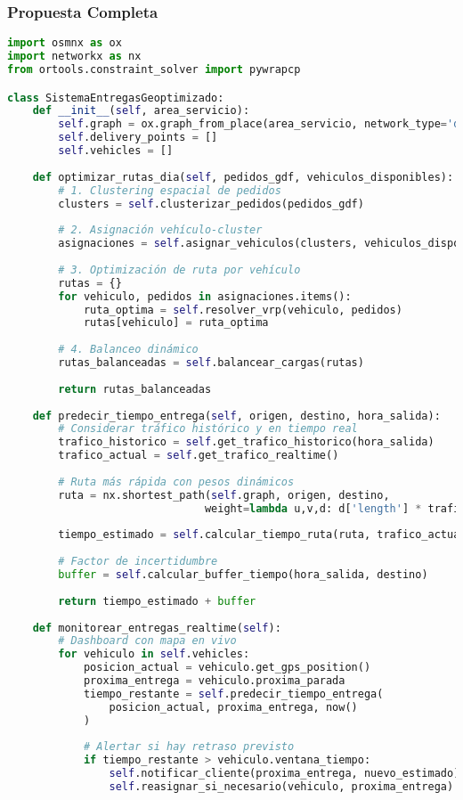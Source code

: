 \documentclass[11pt,a4paper]{article}
\begin{document}
\subsubsection{Propuesta Completa}


\begin{lstlisting}[language=Python,basicstyle=\tiny]
import osmnx as ox
import networkx as nx
from ortools.constraint_solver import pywrapcp

class SistemaEntregasGeoptimizado:
    def __init__(self, area_servicio):
        self.graph = ox.graph_from_place(area_servicio, network_type='drive')
        self.delivery_points = []
        self.vehicles = []
        
    def optimizar_rutas_dia(self, pedidos_gdf, vehiculos_disponibles):
        # 1. Clustering espacial de pedidos
        clusters = self.clusterizar_pedidos(pedidos_gdf)
        
        # 2. Asignación vehículo-cluster
        asignaciones = self.asignar_vehiculos(clusters, vehiculos_disponibles)
        
        # 3. Optimización de ruta por vehículo
        rutas = {}
        for vehiculo, pedidos in asignaciones.items():
            ruta_optima = self.resolver_vrp(vehiculo, pedidos)
            rutas[vehiculo] = ruta_optima
            
        # 4. Balanceo dinámico
        rutas_balanceadas = self.balancear_cargas(rutas)
        
        return rutas_balanceadas
    
    def predecir_tiempo_entrega(self, origen, destino, hora_salida):
        # Considerar tráfico histórico y en tiempo real
        trafico_historico = self.get_trafico_historico(hora_salida)
        trafico_actual = self.get_trafico_realtime()
        
        # Ruta más rápida con pesos dinámicos
        ruta = nx.shortest_path(self.graph, origen, destino, 
                               weight=lambda u,v,d: d['length'] * trafico_actual[u,v])
        
        tiempo_estimado = self.calcular_tiempo_ruta(ruta, trafico_actual)
        
        # Factor de incertidumbre
        buffer = self.calcular_buffer_tiempo(hora_salida, destino)
        
        return tiempo_estimado + buffer
    
    def monitorear_entregas_realtime(self):
        # Dashboard con mapa en vivo
        for vehiculo in self.vehicles:
            posicion_actual = vehiculo.get_gps_position()
            proxima_entrega = vehiculo.proxima_parada
            tiempo_restante = self.predecir_tiempo_entrega(
                posicion_actual, proxima_entrega, now()
            )
            
            # Alertar si hay retraso previsto
            if tiempo_restante > vehiculo.ventana_tiempo:
                self.notificar_cliente(proxima_entrega, nuevo_estimado)
                self.reasignar_si_necesario(vehiculo, proxima_entrega)
\end{lstlisting}
\end{document}

